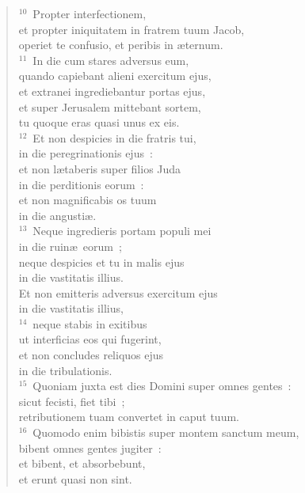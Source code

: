 \begin{verse}
${}^{10}$~Propter interfectionem,\\ et propter iniquitatem in fratrem tuum Jacob,\\ operiet te confusio, et peribis in \ae ternum.\\
${}^{11}$~In die cum stares adversus eum,\\ quando capiebant alieni exercitum ejus,\\ et extranei ingrediebantur portas ejus,\\ et super Jerusalem mittebant sortem,\\ tu quoque eras quasi unus ex eis.\\
${}^{12}$~Et non despicies in die fratris tui,\\ in die peregrinationis ejus~:\\ et non l\ae taberis super filios Juda\\ in die perditionis eorum~:\\ et non magnificabis os tuum\\ in die angusti\ae .\\
${}^{13}$~Neque ingredieris portam populi mei\\ in die ruin\ae\ eorum~;\\ neque despicies et tu in malis ejus\\ in die vastitatis illius.\\ Et non emitteris adversus exercitum ejus\\ in die vastitatis illius,\\
${}^{14}$~neque stabis in exitibus\\ ut interficias eos qui fugerint,\\ et non concludes reliquos ejus\\ in die tribulationis.\\
${}^{15}$~Quoniam juxta est dies Domini super omnes gentes~:\\ sicut fecisti, fiet tibi~;\\ retributionem tuam convertet in caput tuum.\\
${}^{16}$~Quomodo enim bibistis super montem sanctum meum,\\ bibent omnes gentes jugiter~:\\ et bibent, et absorbebunt,\\ et erunt quasi non sint.



\end{verse}
